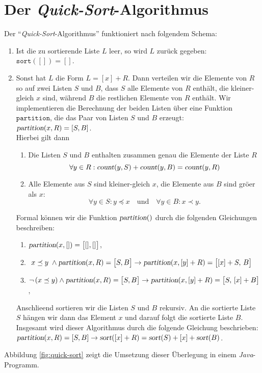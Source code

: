 \section{Der \emph{Quick-Sort}-Algorithmus}
Der ``\emph{Quick-Sort}-Algorithmus'' funktioniert nach folgendem Schema:
\begin{enumerate}
\item Ist die zu sortierende Liste $L$ leer, so wird $L$
      zur\"uck gegeben: \\[0.1cm]
      \hspace*{1.3cm} $\mathtt{sort}([]) = []$.
\item Sonst hat $L$ die Form $L = [x] + R$.
      Dann verteilen wir die Elemente von $R$ so auf zwei Listen $S$ und $B$, 
      dass $S$ alle Elemente von $R$ enth\"alt, die kleiner-gleich $x$ sind, w\"ahrend $B$ die
      restlichen Elemente von $R$ enth\"alt. 
      Wir implementieren die Berechnung der beiden Listen \"uber eine Funktion
      $\mathtt{partition}$, die das Paar von Listen $S$ und $B$ erzeugt: 
      \\[0.2cm]
      \hspace*{1.3cm}
      $\textsl{partition}(x,R) = [S,B]$.
      \\[0.2cm]
      Hierbei gilt dann 
      \begin{enumerate}
      \item Die Listen $S$ und $B$ enthalten zusammen genau die Elemente der Liste $R$
            \[ \forall y \in R: \textsl{count}(y,S) + \textsl{count}(y,B) = \textsl{count}(y,R) \]
      \item Alle Elemente aus $S$ sind kleiner-gleich $x$, die Elemente aus $B$ sind
            gr\"o\3er als $x$:
            \[ \forall y \in S: y \preceq x \quad \mbox{und} \quad \forall y \in B: x \prec y. \]
      \end{enumerate}
      Formal k\"onnen wir die Funktion $\textsl{partition}()$ durch die folgenden
      Gleichungen beschreiben:
      \begin{enumerate}
      \item $\textsl{partition}(x, []) = \bigl[[], []\bigr]$,
      \item \quad $\; x \preceq y\; \wedge \textsl{partition}(x,R) = \bigl[ S, B \bigr] \rightarrow 
             \textsl{partition}(x, [y] + R) = \bigl[ [x] + S,\, B \bigr]$
      \item $\neg\, (x \preceq y) \wedge \textsl{partition}(x,R) = \bigl[ S, B \bigr] \rightarrow 
             \textsl{partition}(x, [y] + R) = \bigl[ S,\, [x] + B \bigr]$,
      \end{enumerate}
      Anschlie\3end sortieren wir die Listen $S$ und $B$ rekursiv.
      An die sortierte Liste $S$ h\"angen wir dann das Element $x$ und darauf folgt die
      sortierte Liste $B$.  Insgesamt wird dieser Algorithmus durch die folgende Gleichung
      beschrieben:
      \\[0.2cm]
      \hspace*{1.3cm}
      $\textsl{partition}(x,R) = [S,B] \rightarrow 
       \textsl{sort}([x] + R) = \textsl{sort}(S) + [x] + \textsl{sort}(B)$.
\end{enumerate}
Abbildung \ref{fig:quick-sort} zeigt die Umsetzung dieser Überlegung 
in einem \textsl{Java}-Programm.

